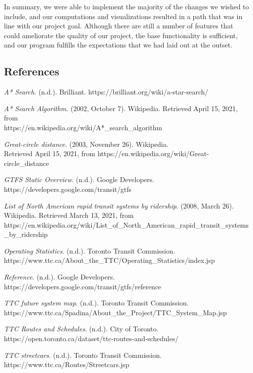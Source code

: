 \documentclass[fontsize=11pt]{article}
\begin{document}
    In summary, we were able to implement the majority of the changes we wished to include, and our computations and visualizations resulted in a path that was in line with our project goal. Although there are still a number of features that could ameliorate the quality of our project, the base functionality is sufficient, and our program fulfills the expectations that we had laid out at the outset.

    \newpage

    \begin{center}
        \section*{References}
    \end{center}

    \hangindent=0.75in
    \textit{A* Search}. (n.d.). Brilliant. https://brilliant.org/wiki/a-star-search/

    \hangindent=0.75in
    \textit{A* Search Algorithm.} (2002, October 7). Wikipedia. Retrieved April 15, 2021, from \\
    https://en.wikipedia.org/wiki/A*\_search\_algorithm

    \hangindent=0.75in
    \textit{Great-circle distance.} (2003, November 26). Wikipedia. \\
    Retrieved April 15, 2021, from https://en.wikipedia.org/wiki/Great-circle\_distance

    \hangindent=0.75in
    \textit{GTFS Static Overview}. (n.d.). Google Developers. https://developers.google.com/transit/gtfs

    \hangindent=0.75in
    \textit{List of North American rapid transit systems by ridership}. (2008, March 26). Wikipedia. Retrieved March 13, 2021, from https://en.wikipedia.org/wiki/List\_of\_North\_American\_rapid\_transit\_systems\_by\_ridership

    \hangindent=0.75in
    \textit{Operating Statistics}. (n.d.). Toronto Transit Commission. \\
    https://www.ttc.ca/About\_the\_TTC/Operating\_Statistics/index.jsp

    \hangindent=0.75in
    \textit{Reference}. (n.d.). Google Developers. https://developers.google.com/transit/gtfs/reference

    \hangindent=0.75in
    \textit{TTC future system map}. (n.d.). Toronto Transit Commission. \\
    https://www.ttc.ca/Spadina/About\_the\_Project/TTC\_System\_Map.jsp

    \hangindent=0.75in
    \textit{TTC Routes and Schedules}. (n.d.). City of Toronto. \\
    https://open.toronto.ca/dataset/ttc-routes-and-schedules/

    \hangindent=0.75in
    \textit{TTC streetcars}. (n.d.). Toronto Transit Commission. https://www.ttc.ca/Routes/Streetcars.jsp
\end{document}
